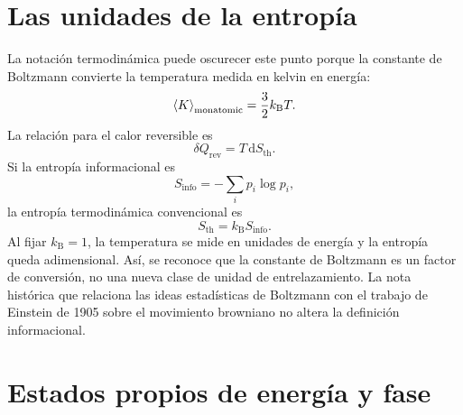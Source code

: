 \section{Las unidades de la entropía}

\begin{classroomqa}
\end{classroomqa}

La notación termodinámica puede oscurecer este punto porque la constante de Boltzmann convierte la temperatura medida en kelvin en energía:
\begin{equation}
\left\langle K\right\rangle_{\mathrm{monatomic}}
=\frac32 k_{\mathrm B}T.
\end{equation}
La relación para el calor reversible es
\begin{equation}
\delta Q_{\mathrm{rev}}=T\,\mathrm dS_{\mathrm{th}}.
\end{equation}
Si la entropía informacional es
\begin{equation}
S_{\mathrm{info}}=-\sum_i p_i\log p_i,
\end{equation}
la entropía termodinámica convencional es
\begin{equation}
S_{\mathrm{th}}=k_{\mathrm B}S_{\mathrm{info}}.
\end{equation}
Al fijar \(k_{\mathrm B}=1\), la temperatura se mide en unidades de energía y la entropía queda adimensional. Así, se reconoce que la constante de Boltzmann es un factor de conversión, no una nueva clase de unidad de entrelazamiento. La nota histórica que relaciona las ideas estadísticas de Boltzmann con el trabajo de Einstein de 1905 sobre el movimiento browniano no altera la definición informacional.

\section{Estados propios de energía y fase}

\begin{classroomqa}
\end{classroomqa}

